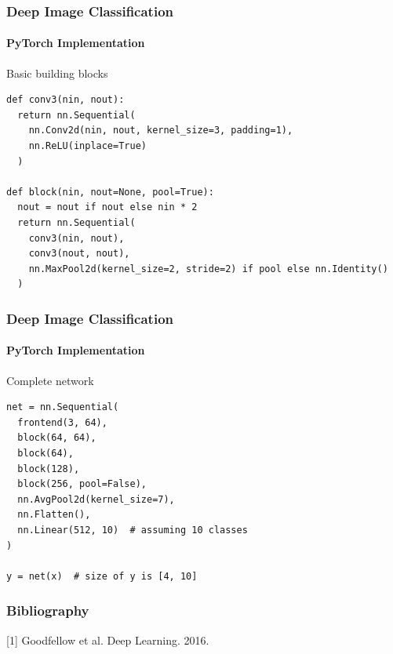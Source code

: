 \documentclass[xetex,professionalfont]{beamer}
\let\oldemph\emph
\renewcommand\emph[1]{\textcolor{tuwcvl_cvl_blue}{#1}}
\begin{document}
\begin{frame}[fragile]
\frametitle{Deep Image Classification}
\framesubtitle{PyTorch Implementation}

Basic building blocks

\medskip

\footnotesize
\begin{verbatim}
def conv3(nin, nout):
  return nn.Sequential(
    nn.Conv2d(nin, nout, kernel_size=3, padding=1),
    nn.ReLU(inplace=True)
  )

def block(nin, nout=None, pool=True):
  nout = nout if nout else nin * 2
  return nn.Sequential(
    conv3(nin, nout),
    conv3(nout, nout),
    nn.MaxPool2d(kernel_size=2, stride=2) if pool else nn.Identity()
  )
\end{verbatim}

\end{frame}


\begin{frame}[fragile]
\frametitle{Deep Image Classification}
\framesubtitle{PyTorch Implementation}

Complete network

\medskip

\footnotesize
\begin{verbatim}
net = nn.Sequential(
  frontend(3, 64),
  block(64, 64),
  block(64),
  block(128),
  block(256, pool=False),
  nn.AvgPool2d(kernel_size=7),
  nn.Flatten(),
  nn.Linear(512, 10)  # assuming 10 classes
)

y = net(x)  # size of y is [4, 10]
\end{verbatim}

\end{frame}


\renewcommand\emph[1]{\oldemph{#1}}

\begin{frame}
\frametitle{Bibliography}

[1] Goodfellow et al. Deep Learning. 2016.

\end{frame}
\end{document}
